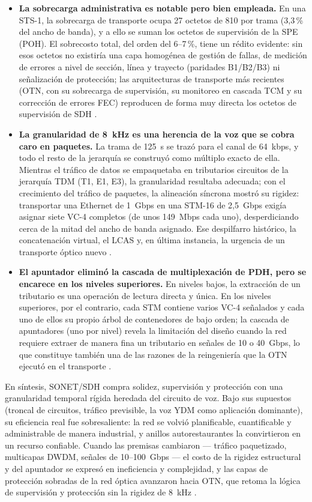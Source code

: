 \documentclass[12pt,a4paper]{article}
\begin{document}
\begin{itemize}
    \item \textbf{La sobrecarga administrativa es notable pero bien empleada.} En una STS-1, la sobrecarga de transporte ocupa 27 octetos de 810 por trama (3{,}3\,\% del ancho de banda), y a ello se suman los octetos de supervisión de la SPE (POH). El sobrecosto total, del orden del 6--7\,\%, tiene un rédito evidente: sin esos octetos no existiría una capa homogénea de gestión de fallas, de medición de errores a nivel de sección, línea y trayecto (paridades B1/B2/B3) ni señalización de protección; las arquitecturas de transporte más recientes (OTN, con su sobrecarga de supervisión, su monitoreo en cascada TCM y su corrección de errores FEC) reproducen de forma muy directa los octetos de supervisión de SDH \cite{itug707, ituG803, ituotn}.
    \item \textbf{La granularidad de 8~kHz es una herencia de la voz que se cobra caro en paquetes.} La trama de 125~\textmu s se trazó para el canal de 64~kbps, y todo el resto de la jerarquía se construyó como múltiplo exacto de ella. Mientras el tráfico de datos se empaquetaba en tributarios circuitos de la jerarquía TDM (T1, E1, E3), la granularidad resultaba adecuada; con el crecimiento del tráfico de paquetes, la alineación síncrona mostró su rigidez: transportar una Ethernet de 1~Gbps en una STM-16 de 2{,}5~Gbps exigía asignar siete VC-4 completos (de unos 149~Mbps cada uno), desperdiciando cerca de la mitad del ancho de banda asignado. Ese despilfarro histórico, la concatenación virtual, el LCAS y, en última instancia, la urgencia de un transporte óptico nuevo \cite{itug707, ituotn}.
    \item \textbf{El apuntador eliminó la cascada de multiplexación de PDH, pero se encarece en los niveles superiores.} En niveles bajos, la extracción de un tributario es una operación de lectura directa y única. En los niveles superiores, por el contrario, cada STM contiene varios VC-4 señalados y cada uno de ellos su propio árbol de contenedores de bajo orden; la cascada de apuntadores (uno por nivel) revela la limitación del diseño cuando la red requiere extraer de manera fina un tributario en señales de 10 o 40~Gbps, lo que constituye también una de las razones de la reingeniería que la OTN ejecutó en el transporte \cite{ituotn}.
\end{itemize}

En síntesis, SONET/SDH compra solidez, supervisión y protección con una granularidad temporal rígida heredada del circuito de voz. Bajo sus supuestos (troncal de circuitos, tráfico previsible, la voz YDM como aplicación dominante), su eficiencia real fue sobresaliente: la red se volvió planificable, cuantificable y administrable de manera industrial, y anillos autorestaurantes la convirtieron en un recurso confiable. Cuando las premisas cambiaron --- tráfico paquetizado, multicapas DWDM, señales de 10--100~Gbps --- el costo de la rigidez estructural y del apuntador se expresó en ineficiencia y complejidad, y las capas de protección sobradas de la red óptica avanzaron hacia OTN, que retoma la lógica de supervisión y protección sin la rigidez de 8~kHz \cite{ituotn, ituG803}.
\end{document}
